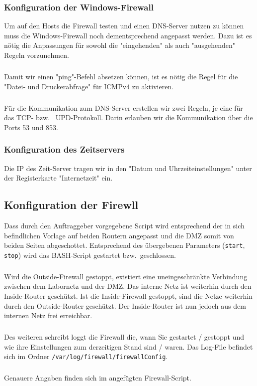 \subsubsection{Konfiguration der Windows-Firewall}
\label{subsubsec:KonfigurationWinFirewall}
Um auf den Hosts die Firewall testen und einen DNS-Server nutzen zu können muss die Windows-Firewall noch dementsprechend angepasst werden.
Dazu ist es nötig die Anpassungen für sowohl die "eingehenden" als auch "ausgehenden" Regeln vorzunehmen.
\subparagraph*{} Damit wir einen "ping"-Befehl absetzen können, ist es nötig die Regel für die "Datei- und Druckerabfrage" für ICMPv4 zu aktivieren.
\subparagraph*{} Für die Kommunikation zum DNS-Server erstellen wir zwei Regeln, je eine für das TCP- bzw. \ UPD-Protokoll. Darin erlauben wir die Kommunikation über die Ports 53 und 853.

\subsubsection{Konfiguration des Zeitservers}
\label{subsubsec:KonfigurationWinNTP}
Die IP des Zeit-Server tragen wir in den "Datum und Uhrzeiteinstellungen" unter der Registerkarte "Internetzeit" ein.

\subsection{Konfiguration der Firewll}
\label{subsec:KonfigurationFirewall}
Dass durch den Auftraggeber vorgegebene Script wird entsprechend der in sich befindlichen Vorlage auf beiden Routern angepasst und die DMZ somit von beiden Seiten abgeschottet. Entsprechend des übergebenen Parameters (\verb+start+, \verb+stop+) wird das BASH-Script gestartet bzw.\ geschlossen.
\subparagraph*{} Wird die Outside-Firewall gestoppt, existiert eine uneingeschränkte Verbindung zwischen dem Labornetz und der DMZ. Das interne Netz ist weiterhin durch den Inside-Router geschützt. Ist die Inside-Firewall gestoppt, sind die Netze weiterhin durch den Outside-Router geschützt. Der Inside-Router ist nun jedoch aus dem internen Netz frei erreichbar.
\subparagraph*{} Des weiteren schreibt loggt die Firewall die, wann Sie gestartet / gestoppt und wie ihre Einstellungen zum derzeitigen Stand sind / waren. Das Log-File befindet sich im Ordner \verb+/var/log/firewall/firewallConfig+.
\subparagraph*{}  Genauere Angaben finden sich im angefügten Firewall-Script.


